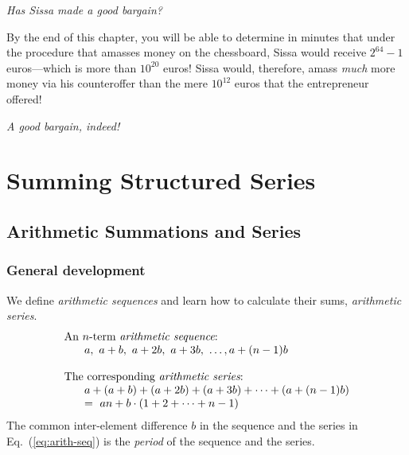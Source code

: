 \medskip

\noindent
{\em Has Sissa made a good bargain?}

\medskip

\noindent
By the end of this chapter, you will be able to determine in minutes that under the procedure that amasses money on the chessboard, Sissa would receive $2^{64} -1$ euros---which is more than $10^{20}$ euros!  Sissa would, therefore, amass {\em much} more money via his counteroffer than the mere $10^{12}$ euros that the entrepreneur offered!

\noindent
{\em A good bargain, indeed!}



\section{Summing Structured Series}
\label{sec:structured-series}

\subsection{Arithmetic Summations and Series}
\label{sec:arithmetic-series}

\subsubsection{General development}

We define {\it arithmetic sequences} and learn how to calculate their sums, {\it arithmetic series}.
 
 
\begin{equation}
\label{eq:arith-seq}
\begin{array}{l}
\mbox{An $n$-term {\em arithmetic sequence}:} \\
\hspace*{.25in}a, \ a+b, \ a+2b, \ a+3b, \ \ldots, a+(n-1)b \\
  \\
\mbox{The corresponding {\em arithmetic series}:} \\
\hspace*{.25in}a + (a+b) + (a+2b) + (a+3b) + \cdots + (a+(n-1)b) \\
\hspace*{.25in} = \
an + b \cdot (1 + 2 + \cdots + n-1)
\end{array}
\end{equation}
The common inter-element difference $b$ in the sequence and the series in Eq.~(\ref{eq:arith-seq}) is the {\it period} of the sequence and the series.
 
